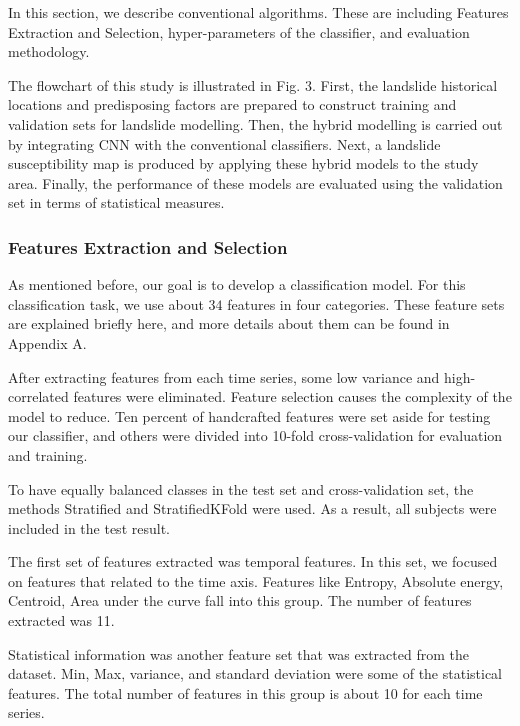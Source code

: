 In this section, we describe conventional algorithms. These are including Features Extraction and Selection, hyper-parameters of the classifier, and evaluation methodology. 

The flowchart of this study is illustrated in Fig. 3. First, the landslide historical locations and predisposing factors are prepared to construct training and validation sets for landslide modelling. Then, the hybrid modelling is carried out by integrating CNN with the conventional classifiers. Next, a landslide susceptibility map is produced by applying these hybrid models to the study area. Finally, the performance of these models are evaluated using the validation set in terms of statistical measures.


\subsubsection{Features Extraction and Selection}

As mentioned before, our goal is to develop a classification model. For this classification task, we use about $34$ features in four categories. These feature sets are explained briefly here, and more details about them can be found in Appendix A.

After extracting features from each time series, some low variance and high-correlated features were eliminated. Feature selection causes the complexity of the model to reduce. Ten percent of handcrafted features were set aside for testing our classifier, and others were divided into 10-fold cross-validation for evaluation and training. 

To have equally balanced classes in the test set and cross-validation set, the methods Stratified and StratifiedKFold were used. As a result, all subjects were included in the test result. %

The first set of features extracted was temporal features. In this set, we focused on features that related to the time axis. Features like Entropy, Absolute energy, Centroid, Area under the curve fall into this group. The number of features extracted was 11.

Statistical information was another feature set that was extracted from the dataset. Min, Max, variance, and standard deviation were some of the statistical features. The total number of features in this group is about 10 for each time series.  

